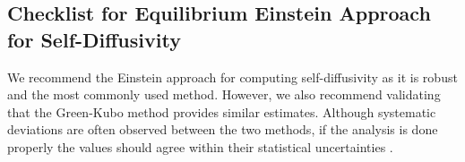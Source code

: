 \documentclass[9pt]{livecoms}
\begin{document}
\subsection{Checklist for Equilibrium Einstein Approach for Self-Diffusivity}


We recommend the Einstein approach for computing self-diffusivity as it is robust and the most commonly used method. However, we also recommend validating that the Green-Kubo method provides similar estimates. Although systematic deviations are often observed between the two methods, if the analysis is done properly the values should agree within their statistical uncertainties \cite{Kondratyuk2016,Liu2012,Mondello1997}. 
\end{document}
